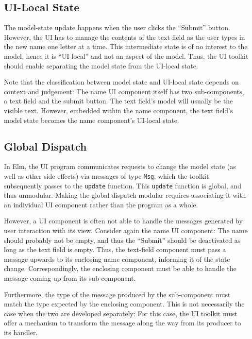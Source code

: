 \documentclass[sigplan,review,screen]{acmart}
\begin{document}
\subsection{UI-Local State}

The model-state update happens when the user clicks the ``Submit''
button.  However, the UI has to manage the contents of the text field
as the user types in the new name one letter at a time.  This
intermediate state is of no interest to the model, hence it is
``UI-local'' and not an aspect
of the model.  Thus, the UI toolkit should enable separating the model state
from the UI-local state.

Note that the classification between model state and UI-local state
depends on context and judgement: The name UI component itself has two
sub-components, a text field and the submit button.  The text field's
model will usually be the visible text.  However, embedded within the
name component, the text field's model state becomes the name
component's UI-local state.

\subsection{Global Dispatch}

In Elm, the UI program communicates requests to change the model state
(as well as other side effects) via messages of type \texttt{Msg},
which the toolkit subsequently passes to the \texttt{update} function.
This \texttt{update} function is global, and thus unmodular.  Making
the global dispatch modular requires associating it with an individual
UI component rather than the program as a whole.

However, a UI component is often not able to handle the messages
generated by user interaction with its view.  Consider again the name UI
component: The name should probably not be empty, and thus the
``Submit'' should be deactivated as long as the text field is empty.
Thus, the text-field component must pass a message upwards to its
enclosing name component, informing it of the state change.
Correspondingly, the enclosing component must be able to handle the
message coming up from its sub-component.

Furthermore, the type of the message produced by the sub-component
must match the type expected by the enclosing component.  This is not
necessarily the case when the two are developed separately: For this
case, the UI toolkit must offer a mechanism to transform the message
along the way from its producer to its handler.
\end{document}
